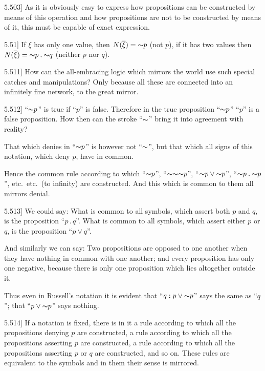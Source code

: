 \documentclass[12pt,oneside]{book}[2007/10/19]
\newcommand{\PropositionE}[2]{%
  \item[\phantomsection\label{PropE:#1}\PropGRef{#1}] #2%
}
\newcommand{\PropGRef}[1]{\hyperref[PropG:#1]{#1}}
\newcommand{\Not}[1]{\mathord{\thicksim} #1}
\newcommand{\DotOp}{\mathbin{.}}
\begin{document}
\begin{propositions}
\PropositionE{5.503}
{As it is obviously easy to express how propositions
can be constructed by means of this operation
and how propositions are not to be constructed by
means of it, this must be capable of exact expression.}


\PropositionE{5.51}
{If $\xi$ has only one value, then $N(\overline{\xi}) = \Not{p}$ (not $p$),
if it has two values then $N(\overline{\xi}) = \Not{p} \DotOp \Not{q}$ (neither
$p$ nor $q$).}


\PropositionE{5.511}
{How can the all-embracing logic which mirrors
the world use such special catches and manipulations?
Only because all these are connected into
an infinitely fine network, to the great mirror.}


\PropositionE{5.512}
{``$\Not{p}$'' is true if ``$p$'' is false. Therefore in the
true proposition ``$\Not{p}$'' ``$p$'' is a false proposition.
How then can the stroke ``$\Not{}$'' bring it into
agreement with reality?

That which denies in ``$\Not{p}$'' is however not
``$\Not{}$'', but that which all signs of this notation,
which deny $p$, have in common.

Hence the common rule according to which
``$\Not{p}$'', ``$\Not{\Not{\Not{p}}}$'', ``${\Not{p}} \lor {\Not{p}}$'', ``$\Not{p} \DotOp \Not{p}$'',
etc.\ etc.\ (to infinity) are constructed. And this
which is common to them all mirrors denial.}


\PropositionE{5.513}
{We could say: What is common to all symbols,
which assert both $p$ and $q$, is the proposition
``$p \DotOp q$''. What is common to all symbols, which
assert either $p$ or $q$, is the proposition ``$p \lor q$''.

And similarly we can say: Two propositions
are opposed to one another when they have
nothing in common with one another; and every
proposition has only one negative, because there
is only one proposition which lies altogether
outside it.

Thus even in Russell's notation it is evident
that ``${q : p} \lor {\Not{p}}$'' says the same as ``$q$''; that
``$p \lor {\Not{p}}$'' says nothing.}


\PropositionE{5.514}
{If a notation is fixed, there is in it a rule according
to which all the propositions denying $p$ are
constructed, a rule according to which all the
propositions asserting $p$ are constructed, a rule
according to which all the propositions asserting
$p$ or $q$ are constructed, and so on. These rules
are equivalent to the symbols and in them their
sense is mirrored.}



\end{propositions}
\end{document}
